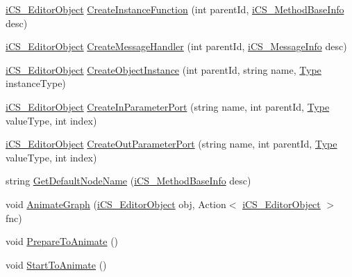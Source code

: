 \begin{DoxyCompactItemize}
\item 
\hyperlink{classi_c_s___editor_object}{i\+C\+S\+\_\+\+Editor\+Object} \hyperlink{classi_c_s___i_storage_a0a472074a595e30c679f0f6cfdb16dfa}{Create\+Instance\+Function} (int parent\+Id, \hyperlink{classi_c_s___method_base_info}{i\+C\+S\+\_\+\+Method\+Base\+Info} desc)
\item 
\hyperlink{classi_c_s___editor_object}{i\+C\+S\+\_\+\+Editor\+Object} \hyperlink{classi_c_s___i_storage_a6b4f02ae7e66c99d87288b5c09f3702c}{Create\+Message\+Handler} (int parent\+Id, \hyperlink{classi_c_s___message_info}{i\+C\+S\+\_\+\+Message\+Info} desc)
\item 
\hyperlink{classi_c_s___editor_object}{i\+C\+S\+\_\+\+Editor\+Object} \hyperlink{classi_c_s___i_storage_ab218180504e179cbc05c8a5ef6423523}{Create\+Object\+Instance} (int parent\+Id, string name, \hyperlink{i_c_s___object_type_enum_8cs_ae6c3dd6d8597380b56d94908eb431547aa1fa27779242b4902f7ae3bdd5c6d508}{Type} instance\+Type)
\item 
\hyperlink{classi_c_s___editor_object}{i\+C\+S\+\_\+\+Editor\+Object} \hyperlink{classi_c_s___i_storage_a3388879877379f9213a6e1d401be41ef}{Create\+In\+Parameter\+Port} (string name, int parent\+Id, \hyperlink{i_c_s___object_type_enum_8cs_ae6c3dd6d8597380b56d94908eb431547aa1fa27779242b4902f7ae3bdd5c6d508}{Type} value\+Type, int index)
\item 
\hyperlink{classi_c_s___editor_object}{i\+C\+S\+\_\+\+Editor\+Object} \hyperlink{classi_c_s___i_storage_a15ae26c7ab51f129cc84c9c693c594b7}{Create\+Out\+Parameter\+Port} (string name, int parent\+Id, \hyperlink{i_c_s___object_type_enum_8cs_ae6c3dd6d8597380b56d94908eb431547aa1fa27779242b4902f7ae3bdd5c6d508}{Type} value\+Type, int index)
\item 
string \hyperlink{classi_c_s___i_storage_a2c35ac8d1ded50e0c640e568509388a7}{Get\+Default\+Node\+Name} (\hyperlink{classi_c_s___method_base_info}{i\+C\+S\+\_\+\+Method\+Base\+Info} desc)
\item 
void \hyperlink{classi_c_s___i_storage_aa1031a09d22bf015a70746e8abf4c6c5}{Animate\+Graph} (\hyperlink{classi_c_s___editor_object}{i\+C\+S\+\_\+\+Editor\+Object} obj, Action$<$ \hyperlink{classi_c_s___editor_object}{i\+C\+S\+\_\+\+Editor\+Object} $>$ fnc)
\item 
void \hyperlink{classi_c_s___i_storage_a6deff00035c84b2399c18f1870901ea4}{Prepare\+To\+Animate} ()
\item 
void \hyperlink{classi_c_s___i_storage_a12a0448e9e4d7eaf44ee9507f8c5d1ff}{Start\+To\+Animate} ()
\item 

\end{DoxyCompactItemize}
